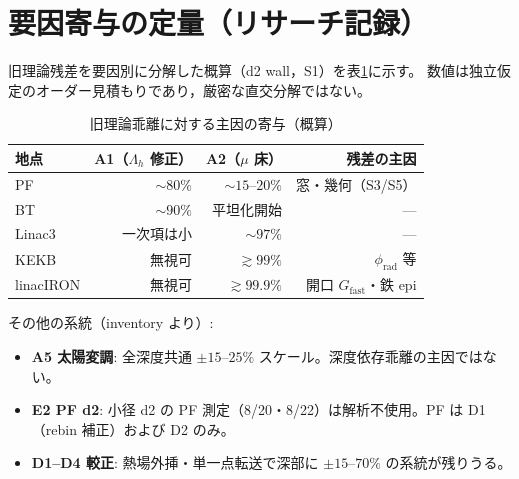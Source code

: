 \documentclass[a4paper,11pt]{ltjsarticle}
\begin{document}
\section{要因寄与の定量（リサーチ記録）}

旧理論残差を要因別に分解した概算（d2 wall，S1）を表\ref{tab:contrib}に示す。
数値は独立仮定のオーダー見積もりであり，厳密な直交分解ではない\cite{S1}。

\begin{table}[htbp]
  \centering
  \caption{旧理論乖離に対する主因の寄与（概算）}
  \label{tab:contrib}
  \begin{tabular}{lrrr}
    \toprule
    地点 & A1（$\Lambda_h$ 修正） & A2（$\mu$ 床） & 残差の主因 \\
    \midrule
    PF & $\sim80\%$ & $\sim15$--$20\%$ & 窓・幾何（S3/S5） \\
    BT & $\sim90\%$ & 平坦化開始 & --- \\
    Linac3 & 一次項は小 & $\sim97\%$ & --- \\
    KEKB & 無視可 & $\gtrsim99\%$ & $\phi_{\mathrm{rad}}$ 等 \\
    linacIRON & 無視可 & $\gtrsim99.9\%$ & 開口 $G_{\mathrm{fast}}$・鉄 epi \\
    \bottomrule
  \end{tabular}
\end{table}

その他の系統（inventory より）:
\begin{itemize}
  \item \textbf{A5 太陽変調}: 全深度共通 $\pm15$--$25\%$ スケール。深度依存乖離の主因ではない\cite{Sato2015}。
  \item \textbf{E2 PF d2}: 小径 d2 の PF 測定（8/20・8/22）は解析不使用。PF は D1（rebin 補正）および D2 のみ。
  \item \textbf{D1--D4 較正}: 熱場外挿・単一点転送で深部に $\pm15$--$70\%$ の系統が残りうる\cite{S4}。
\end{itemize}
\end{document}
